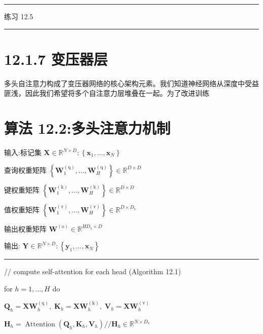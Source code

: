 \documentclass[10pt]{report}
\newcommand{\HRule}{\begin{center}\rule{0.9\linewidth}{0.2mm}\end{center}}
\begin{document}
\HRule

练习 12.5

\HRule

\section*{12.1.7 变压器层}

多头自注意力构成了变压器网络的核心架构元素。我们知道神经网络从深度中受益匪浅，因此我们希望将多个自注意力层堆叠在一起。为了改进训练

\section*{算法 12.2:多头注意力机制}

输入:标记集 \(\mathbf{X} \in  {\mathbb{R}}^{N \times  D} : \left\{  {{\mathbf{x}}_{1},\ldots ,{\mathbf{x}}_{N}}\right\}\)

查询权重矩阵 \(\left\{  {{\mathbf{W}}_{1}^{\left( \mathrm{q}\right) },\ldots ,{\mathbf{W}}_{H}^{\left( \mathrm{q}\right) }}\right\}   \in  {\mathbb{R}}^{D \times  D}\)

键权重矩阵 \(\left\{  {{\mathbf{W}}_{1}^{\left( \mathrm{k}\right) },\ldots ,{\mathbf{W}}_{H}^{\left( \mathrm{k}\right) }}\right\}   \in  {\mathbb{R}}^{D \times  D}\)

值权重矩阵 \(\left\{  {{\mathbf{W}}_{1}^{\left( \mathrm{v}\right) },\ldots ,{\mathbf{W}}_{H}^{\left( \mathrm{v}\right) }}\right\}   \in  {\mathbb{R}}^{D \times  {D}_{\mathrm{v}}}\)

输出权重矩阵 \({\mathbf{W}}^{\left( \mathrm{o}\right) } \in  {\mathbb{R}}^{H{D}_{\mathrm{v}} \times  D}\)

输出: \(\mathbf{Y} \in  {\mathbb{R}}^{N \times  D} : \left\{  {{\mathbf{y}}_{1},\ldots ,{\mathbf{x}}_{N}}\right\}\)

\HRule

// compute self-attention for each head (Algorithm 12.1)

for \(h = 1,\ldots ,H\) do

\hspace*{1em} \({\mathbf{Q}}_{h} = {\mathbf{{XW}}}_{h}^{\left( \mathrm{q}\right) },\;{\mathbf{K}}_{h} = {\mathbf{{XW}}}_{h}^{\left( \mathrm{k}\right) },\;{\mathbf{V}}_{h} = {\mathbf{{XW}}}_{h}^{\left( \mathrm{v}\right) }\)

\hspace*{1em} \({\mathbf{H}}_{h} = \operatorname{Attention}\left( {{\mathbf{Q}}_{h},{\mathbf{K}}_{h},{\mathbf{V}}_{h}}\right) //{\mathbf{H}}_{h} \in  {\mathbb{R}}^{N \times  {D}_{\mathrm{v}}}\)
\end{document}
